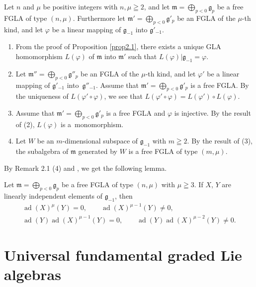 \documentclass[pdftex]{sigma}
\numberwithin{equation}{section}
\numberwithin{theorem}{section}
\numberwithin{proposition}{section}
\numberwithin{lemma}{section}
\numberwithin{corollary}{section}
\numberwithin{definition}{section}
\numberwithin{example}{section}
\numberwithin{remark}{section}
\numberwithin{note}{section}
\newcommand{\ad}{\operatorname{ad}}
\begin{document}
\begin{remark}
Let $n$ and $\mu$ be positive integers with $n,\mu\geqq2$, and
let $\mathfrak m=\bigoplus\limits_{p<0}\mathfrak g_p$ be a free FGLA of
type $(n,\mu)$.  Furthermore
let $\mathfrak m'=\bigoplus\limits_{p<0}\mathfrak g'_p$
be an FGLA of the $\mu$-th kind,
and let $\varphi$ be a linear mapping of $\mathfrak g_{-1}$ into
$\mathfrak g'_{-1}$.
\begin{enumerate}\itemsep=0pt
\item
From the proof of Proposition \ref{prop2.1}, there exists a unique GLA
homomorphism $L(\varphi)$ of $\mathfrak m$ into $\mathfrak m'$
such that $L(\varphi)|\mathfrak g_{-1}=\varphi$.
\item
Let $\mathfrak m''=\bigoplus\limits_{p<0}\mathfrak g''_p$
be an FGLA of the $\mu$-th kind,
and let $\varphi'$ be a linear mapping of $\mathfrak g'_{-1}$ into~$\mathfrak g''_{-1}$. Assume that $\mathfrak m'=\bigoplus\limits_{p<0}\mathfrak g'_p$ is a free FGLA. By the uniqueness of $L(\varphi'\circ\varphi)$,
we see that
$L(\varphi'\circ\varphi)=L(\varphi')\circ L(\varphi)$.
\item Assume that $\mathfrak m'=\bigoplus\limits_{p<0}\mathfrak g'_p$ is a
free FGLA and $\varphi$ is injective. By the result of (2),
$L(\varphi)$ is a~monomorphism.
\item Let $W$ be an $m$-dimensional subspace of $\mathfrak g_{-1}$ with $m\geqq2$.
By the result of (3), the subalgebra of $\mathfrak m$ generated by $W$ is a
free FGLA of type $(m,\mu)$.
\end{enumerate}
\end{remark}
By Remark 2.1 (4) and \cite[Chapter~II, \S~2, Theorem~1]{bou72:1}, we get the following lemma.
\begin{lemma}\label{lem2.1} Let $\mathfrak m=\bigoplus\limits_{p<0}\mathfrak g_p$ be a
free FGLA of type $(n,\mu)$ with $\mu\geqq3$.
If $X$, $Y$ are linearly independent elements of $\mathfrak g_{-1}$, then
\begin{gather*}
\ad(X)^\mu(Y)=0, \qquad \ad(X)^{\mu-1}(Y)\ne 0, \\
\ad(Y)\ad(X)^{\mu-1}(Y)=0, \qquad \ad(Y)\ad(X)^{\mu-2}(Y)\ne 0.
\end{gather*}
\end{lemma}

\section{Universal fundamental graded Lie algebras}\label{section3}
\end{document}
